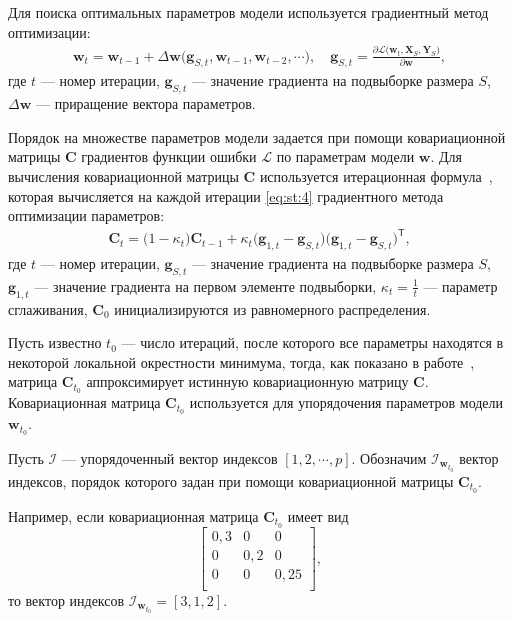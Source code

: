 Для поиска оптимальных параметров модели используется градиентный метод оптимизации:
\[
\label{eq:st:4}
\begin{aligned}
\textbf{w}_{t} = \textbf{w}_{t-1} + \Delta\textbf{w}\bigr(\textbf{g}_{S,t}, \textbf{w}_{t-1}, \textbf{w}_{t-2}, \cdots\bigr), \quad \textbf{g}_{S,t}=\frac{\partial \mathcal{L}\bigr(\textbf{w}_{t}, \textbf{X}_{S}, \textbf{Y}_{S}\bigr)}{\partial \textbf{w}},
\end{aligned}
\]
где $t$ --- номер итерации, $\textbf{g}_{S,t}$ --- значение градиента на подвыборке размера $S$, $\Delta\textbf{w}$ --- приращение вектора параметров.
 
 
Порядок на множестве параметров модели задается при помощи ковариационной матрицы $\textbf{C}$ градиентов функции ошибки $\mathcal{L}$ по параметрам модели $\textbf{w}$. Для вычисления ковариационной матрицы $\textbf{C}$ используется итерационная формула~\cite{Chunyan2016}, которая вычисляется на каждой итерации \eqref{eq:st:4} градиентного метода оптимизации параметров:
\[
\label{eq:st:5}
\begin{aligned}
\textbf{C}_t = \bigr(1-\kappa_t\bigr)\textbf{C}_{t-1}+\kappa_t\bigr(\textbf{g}_{1,t}-\textbf{g}_{S,t}\bigr)\bigr(\textbf{g}_{1,t}-\textbf{g}_{S,t}\bigr)^{\mathsf{T}},
\end{aligned}
\]
 где $t$ --- номер итерации, $\textbf{g}_{S,t}$ --- значение градиента на подвыборке размера $S$, $\textbf{g}_{1,t}$ --- значение градиента на первом элементе подвыборки, $\kappa_t=\frac{1}{t}$ --- параметр сглаживания, $\textbf{C}_0$ инициализируются из равномерного распределения.
 
Пусть известно $t_0$ --- число итераций, после которого все параметры находятся в некоторой локальной окрестности минимума, тогда, как показано в работе~\cite{Chunyan2016}, матрица $\textbf{C}_{t_0}$ аппроксимирует истинную ковариационную матрицу $\textbf{C}$. Ковариационная матрица $\textbf{C}_{t_0}$ используется для упорядочения параметров модели $\textbf{w}_{t_0}$. 
 
Пусть $\mathcal{I}$ ---  упорядоченный вектор индексов $[1, 2, \cdots, p]$. Обозначим $\mathcal{I}_{\textbf{w}_{t_0}}$ вектор индексов, порядок которого задан при помощи ковариационной матрицы $\textbf{C}_{t_0}$. 
 
Например, если ковариационная матрица $\textbf{C}_{t_0}$  имеет вид
 $$
\begin{bmatrix}
0{,}3& 0 & 0\\
0& 0{,}2 & 0\\
0& 0 & 0{,}25\\
\end{bmatrix},
 $$
 то вектор индексов $\mathcal{I}_{\textbf{w}_{t_0}} = [3,1,2]$.
 
